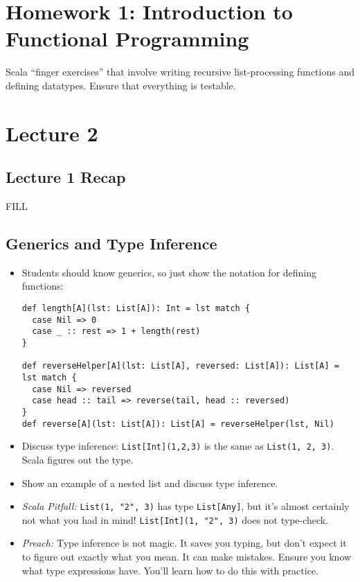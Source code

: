 \documentclass{book}
\begin{document}
\chapter{Homework 1: Introduction to Functional Programming}

Scala ``finger exercises'' that involve writing recursive list-processing
functions and defining datatypes. Ensure that everything is testable.

\chapter{Lecture 2}

\section{Lecture 1 Recap}

FILL

\section{Generics and Type Inference}

\begin{itemize}

\item Students should know generics, so just show the notation for defining
functions:
%
\begin{verbatim}
def length[A](lst: List[A]): Int = lst match {
  case Nil => 0
  case _ :: rest => 1 + length(rest)
}

def reverseHelper[A](lst: List[A], reversed: List[A]): List[A] = lst match {
  case Nil => reversed
  case head :: tail => reverse(tail, head :: reversed)
}
def reverse[A](lst: List[A]): List[A] = reverseHelper(lst, Nil)
\end{verbatim}


\item Discuss type inference: \verb|List[Int](1,2,3)| is the same as
\verb|List(1, 2, 3)|. Scala figures out the type.

\item Show an example of a nested list and discuss type inference.

\item \emph{Scala Pitfall:} \verb|List(1, "2", 3)| has type \verb|List[Any]|,
but it's almost certainly not what you had in mind!
\verb|List[Int](1, "2", 3)| does not type-check.

\item \emph{Preach:} Type inference is not magic. It saves you typing, but
don't expect it to figure out exactly what you mean. It can make mistakes.
Ensure you know what type expressions have. You'll learn how to do this
with practice.

\end{itemize}
\end{document}
